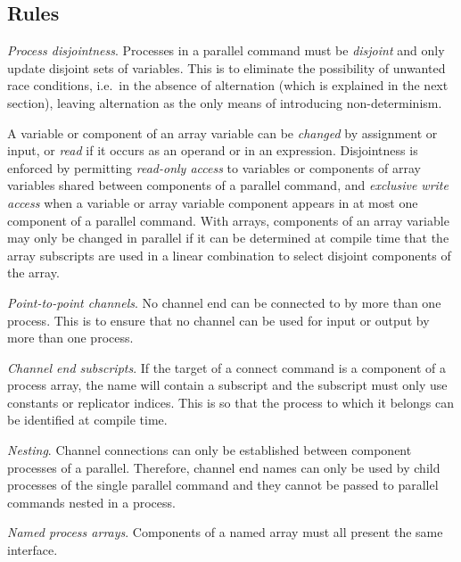 \documentclass[11pt,a4paper,parskip=half-]{scrartcl}
\begin{document}
\subsection{Rules}

\ben[resume]

\label{sec:parallel-disjointness}
%
\item \emph{Process disjointness}.  Processes in a parallel command must be
  \emph{disjoint} and only update disjoint sets of variables. This is to
  eliminate the possibility of unwanted race conditions, i.e.\ in the absence
  of alternation (which is explained in the next section), leaving alternation
  as the only means of introducing non-determinism.

  A variable or component of an array variable can be \emph{changed} by
  assignment or input, or \emph{read} if it occurs as an operand or in an
  expression.
  Disjointness is enforced by permitting \emph{read-only access} to variables
  or components of array variables shared between components of a parallel
  command, and \emph{exclusive write access} when a variable or array variable
  component appears in at most one component of a parallel command.
  With arrays, components of an array variable may only be changed in parallel
  if it can be determined at compile time that the array subscripts are used in
  a linear combination to select disjoint components of the array.

\item \emph{Point-to-point channels}. No channel end can be connected to by
  more than one process. This is to ensure that no channel can be used for
  input or output by more than one process.

\item \emph{Channel end subscripts}.  If the target of a connect command is a
  component of a process array, the name will contain a subscript and the
  subscript must only use constants or replicator indices. This is so that the
  process to which it belongs can be identified at compile time.

\item \emph{Nesting}. Channel connections can only be established between
  component processes of a parallel. Therefore, channel end names can only be
  used by child processes of the single parallel command and they cannot be
  passed to parallel commands nested in a process.

\item \emph{Named process arrays}. Components of a named array must all present
  the same interface.
\end{document}
